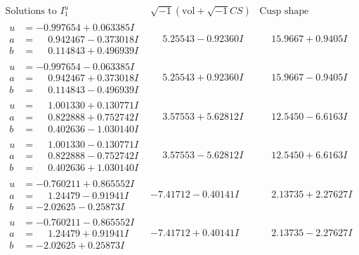 \documentclass[1p]{elsarticle_modified}
\theoremstyle{definition}
\newcommand{\I}{\sqrt{-1}}
\begin{document}
$$\begin{array}{c|c|c}  
\text{Solutions to }I^u_{1}& \I (\text{vol} + \sqrt{-1}CS) & \text{Cusp shape}\\
 \hline 
\begin{aligned}
u &= -0.997654 + 0.063385 I \\
a &= \phantom{-}0.942467 - 0.373018 I \\
b &= \phantom{-}0.114843 + 0.496939 I\end{aligned}
 & \phantom{-}5.25543 - 0.92360 I & \phantom{-}15.9667 + 0.9405 I \\ \hline\begin{aligned}
u &= -0.997654 - 0.063385 I \\
a &= \phantom{-}0.942467 + 0.373018 I \\
b &= \phantom{-}0.114843 - 0.496939 I\end{aligned}
 & \phantom{-}5.25543 + 0.92360 I & \phantom{-}15.9667 - 0.9405 I \\ \hline\begin{aligned}
u &= \phantom{-}1.001330 + 0.130771 I \\
a &= \phantom{-}0.822888 + 0.752742 I \\
b &= \phantom{-}0.402636 - 1.030140 I\end{aligned}
 & \phantom{-}3.57553 + 5.62812 I & \phantom{-}12.5450 - 6.6163 I \\ \hline\begin{aligned}
u &= \phantom{-}1.001330 - 0.130771 I \\
a &= \phantom{-}0.822888 - 0.752742 I \\
b &= \phantom{-}0.402636 + 1.030140 I\end{aligned}
 & \phantom{-}3.57553 - 5.62812 I & \phantom{-}12.5450 + 6.6163 I \\ \hline\begin{aligned}
u &= -0.760211 + 0.865552 I \\
a &= \phantom{-}1.24479 - 0.91941 I \\
b &= -2.02625 - 0.25873 I\end{aligned}
 & -7.41712 - 0.40141 I & \phantom{-}2.13735 + 2.27627 I \\ \hline\begin{aligned}
u &= -0.760211 - 0.865552 I \\
a &= \phantom{-}1.24479 + 0.91941 I \\
b &= -2.02625 + 0.25873 I\end{aligned}
 & -7.41712 + 0.40141 I & \phantom{-}2.13735 - 2.27627 I \\ \hline\begin{aligned}

\end{aligned}
\end{array}$$
\end{document}
